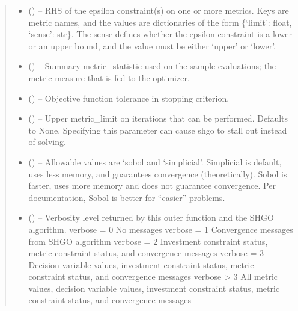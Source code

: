 \documentclass[letterpaper,10pt,english]{sphinxmanual}
\begin{document}
\begin{fulllineitems}
\begin{fulllineitems}
\begin{quote}
\begin{description}
\begin{itemize}
\item {} 
\sphinxAtStartPar
{} () – RHS of the epsilon constraint(s) on one or more metrics. Keys are metric
names, and the values are dictionaries of the form
\{‘limit’: float, ‘sense’: str\}. The sense defines whether the epsilon
constraint is a lower or an upper bound, and the value must be either
‘upper’ or ‘lower’.

\item {} 
\sphinxAtStartPar
{} () – Summary metric\_statistic used on the sample evaluations; the metric
measure that is fed to the optimizer.

\item {} 
\sphinxAtStartPar
{} () – Objective function tolerance in stopping criterion.

\item {} 
\sphinxAtStartPar
{} () – Upper metric\_limit on iterations that can be performed. Defaults to None.
Specifying this parameter can cause shgo to stall out instead of solving.

\item {} 
\sphinxAtStartPar
{} () – Allowable values are ‘sobol and ‘simplicial’. Simplicial is default, uses
less memory, and guarantees convergence (theoretically). Sobol is faster,
uses more memory and does not guarantee convergence. Per documentation,
Sobol is better for “easier” problems.

\item {} 
\sphinxAtStartPar
{} () – Verbosity level returned by this outer function and the SHGO algorithm.
verbose = 0     No messages
verbose = 1     Convergence messages from SHGO algorithm
verbose = 2     Investment constraint status, metric constraint status,
and convergence messages
verbose = 3     Decision variable values, investment constraint status,
metric constraint status, and convergence messages
verbose > 3     All metric values, decision variable values, investment
constraint status, metric constraint status, and
convergence messages


\end{itemize}
\end{description}
\end{quote}
\end{fulllineitems}
\end{fulllineitems}
\end{document}
